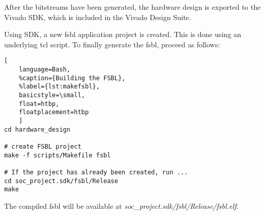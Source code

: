 After the bitstreams have been generated, the hardware design is exported to the Vivado SDK, which is included in the Vivado Design Suite.

Using SDK, a new \gls{fsbl} application project is created. This is done using an underlying \gls{tcl} script. To finally generate the \gls{fsbl}, proceed as follows:
\begin{lstlisting}[
	language=Bash,
	%caption={Building the FSBL},
	%label={lst:makefsbl},
	basicstyle=\small,
	float=htbp,
	floatplacement=htbp
	]
cd hardware_design

# create FSBL project
make -f scripts/Makefile fsbl

# If the project has already been created, run ...
cd soc_project.sdk/fsbl/Release
make
\end{lstlisting}
\FloatBarrier

The compiled \gls{fsbl} will be available at \emph{soc_project.sdk/fsbl/Release/fsbl.elf}.
